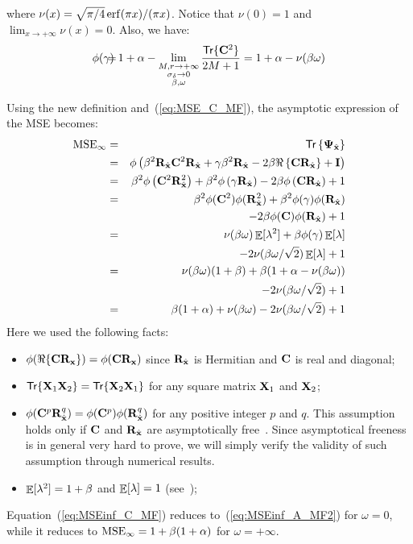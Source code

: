 \documentclass[final, a4paper]{IEEEtran}
\newcommand{\erf}{{\rm erf}}
\newcommand{\xv}{{\bf x}}
\newcommand{\Cm}{{\bf C}}
\newcommand{\Id}{{\bf I}}
\newcommand{\Rm}{{\bf R}}
\newcommand{\Xm}{{\bf X}}
\def\xvh{{\hat{\xv}}}
\newcommand{\Psim}{\hbox{\boldmath$\Psi$}}
\def\trace{\mathsf{Tr}}
\def\non{\nonumber\\}
\def\MSEinf{{\rm MSE}_{\infty}}
\def\limbetaomega{\lim_{\substack{M,r\rightarrow +\infty \\ \sigma_\delta\rightarrow 0
                         \\\beta, \omega}}}
\begin{document}
where $\nu(x)=\sqrt{\pi/4}\,\erf(\pi x)/(\pi x)$. Notice that $\nu(0)=1$ and
$\lim_{x\rightarrow +\infty}\nu(x) = 0$.
Also,  we have:
\begin{eqnarray} \label{eq:Psi-gamma}
\phi(\gamma) \hspace{-3mm} & =  &\hspace{-3mm} 1+ \alpha - \limbetaomega \frac{\trace\{\Cm^2\}}{2M+1}
= 1+\alpha -\nu(\beta\omega)
\end{eqnarray}

Using the new definition and~(\ref{eq:MSE_C_MF}), the asymptotic expression of the MSE
becomes:
\begin{eqnarray}
\MSEinf
&=& \trace\left\{\Psim_\xvh\right\}\non
&=& \phi\left(\beta^2\Rm_\xvh\Cm^2\Rm_\xvh +\gamma\beta^2\Rm_\xvh -2\beta \Re\left\{\Cm\Rm_\xvh\right\}+\Id\right)\non
&=& \beta^2 \phi\left(\Cm^2\Rm_\xvh^2\right)+\beta^2\phi\left(\gamma\Rm_\xvh\right)-2\beta\phi\left(\Cm\Rm_\xvh\right) +1\non
&=& \beta^2\phi(\Cm^2)\phi(\Rm_\xvh^2)+\beta^2\phi(\gamma)\phi(\Rm_\xvh) \non
& & \qquad -2\beta\phi(\Cm)\phi(\Rm_\xvh)  + 1\non
&=& \nu(\beta\omega)\EE[\lambda^2] +\beta\phi(\gamma)\EE[\lambda] \non
& & \qquad -2\nu(\beta\omega/\sqrt{2})\EE[\lambda] +1 \non
&=& \nu(\beta\omega)(1+\beta) +\beta(1+\alpha-\nu(\beta\omega)) \non
& & \qquad -2\nu(\beta\omega/\sqrt{2}) +1 \non
&=& \beta(1+\alpha) +\nu(\beta\omega) -2\nu(\beta\omega/\sqrt{2}) +1
\label{eq:MSEinf_C_MF}
\end{eqnarray}
Here we used the following facts:
\begin{itemize}
\item $\phi(\Re\{\Cm\Rm_\xv\}) = \phi(\Cm\Rm_\xv)$ since $\Rm_\xvh$ is Hermitian and $\Cm$ is real and diagonal;
\item $\trace\{\Xm_1\Xm_2\} = \trace\{\Xm_2\Xm_1\}$ for any square matrix $\Xm_1$ and $\Xm_2$;
\item $\phi(\Cm^p\Rm_\xvh^q) = \phi(\Cm^p)\phi(\Rm_\xvh^q)$ for any positive integer $p$ and $q$.
This assumption holds only if $\Cm$ and $\Rm_\xvh$ are asymptotically free~\cite{TulinoVerdu}.
Since asymptotical freeness is in general very hard to prove, we will simply verify the validity
of such assumption through numerical results.
\item $\mathop{\mathbb{E}}\limits[\lambda^2] =1+\beta$ and $\mathop{\mathbb{E}}\limits[\lambda] =1$ (see~\cite{NordioChiasseriniViterbo});
\end{itemize}
Equation~(\ref{eq:MSEinf_C_MF}) reduces to~(\ref{eq:MSEinf_A_MF2}) for $\omega=0$,
while it reduces to $\MSEinf=1+\beta(1+\alpha)$ for $\omega=+\infty$.
\end{document}
